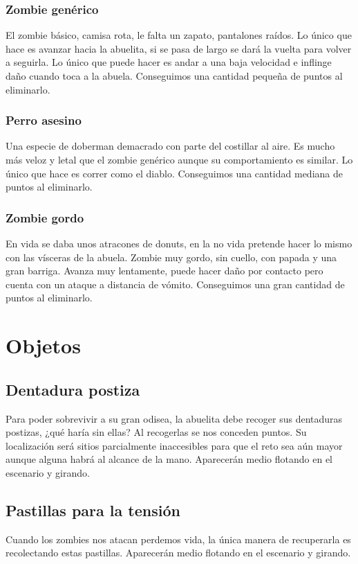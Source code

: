 \documentclass[titlepage]{article}
\begin{document}
\subsubsection{Zombie genérico}
El zombie básico, camisa rota, le falta un zapato, pantalones raídos. Lo único que hace es avanzar hacia la abuelita, si se pasa de largo se dará la vuelta para volver a seguirla. Lo único que puede hacer es andar a una baja velocidad e inflinge daño cuando toca a la abuela. Conseguimos una cantidad pequeña de puntos al eliminarlo.

\subsubsection{Perro asesino} 
Una especie de doberman demacrado con parte del costillar al aire. Es mucho más veloz y letal que el zombie genérico aunque su comportamiento es similar. Lo único que hace es correr como el diablo. Conseguimos una cantidad mediana de puntos al eliminarlo.

\subsubsection{Zombie gordo}
En vida se daba unos atracones de donuts, en la no vida pretende hacer lo mismo con las vísceras de la abuela. Zombie muy gordo, sin cuello, con papada y una gran barriga. Avanza muy lentamente, puede hacer daño por contacto pero cuenta con un ataque a distancia de vómito. Conseguimos una gran cantidad de puntos al eliminarlo.

\section{Objetos}

\subsection{Dentadura postiza}
Para poder sobrevivir a su gran odisea, la abuelita debe recoger sus dentaduras postizas, ¿qué haría sin ellas? Al recogerlas se nos conceden puntos. Su localización será sitios parcialmente inaccesibles para que el reto sea aún mayor aunque alguna habrá al alcance de la mano. Aparecerán medio flotando en el escenario y girando.

\subsection{Pastillas para la tensión}
Cuando los zombies nos atacan perdemos vida, la única manera de recuperarla es recolectando estas pastillas. Aparecerán medio flotando en el escenario y girando.
\end{document}
